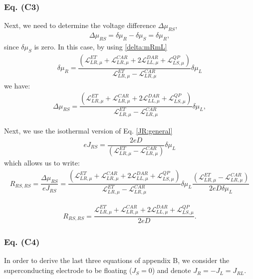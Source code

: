 \subsubsection{Eq. (C3)}

Next, we need to determine the voltage difference $\Delta\mu_{RS}$,
\begin{align*}
\Delta\mu_{RS}=\delta\mu_{R}-\delta\mu_{S}
=
\delta\mu_{R},
\end{align*}
since $\delta\mu_{S}$ is zero. In this case, by using \eqref{delta:mRmL}
\begin{align*}
\delta\mu_{R}=\dfrac{(\mathcal{L}_{LR,\mu}^{ET}+\mathcal{L}_{LR,\mu}^{CAR}+2\mathcal{L}_{LL,\mu}^{DAR}
+
\mathcal{L}^{QP}_{LS,\mu})}{\mathcal{L}_{LR,\mu}^{ET}-\mathcal{L}_{LR,\mu}^{CAR}}\delta\mu_{L}
\end{align*}
we have:
\begin{align*}
\Delta\mu_{RS}=\dfrac{(\mathcal{L}_{LR,\mu}^{ET}+\mathcal{L}_{LR,\mu}^{CAR}+2\mathcal{L}_{LL,\mu}^{DAR}
+
\mathcal{L}^{QP}_{LS,\mu})}{\mathcal{L}_{LR,\mu}^{ET}-\mathcal{L}_{LR,\mu}^{CAR}}\delta\mu_{L},
\end{align*}

Next, we use the isothermal version of Eq. \eqref{JR:general}
\begin{align*}
eJ_{RS}=
\dfrac{2eD}{(\mathcal{L}_{LR,\mu}^{ET}-\mathcal{L}_{LR,\mu}^{CAR})}\delta\mu_{L}
\end{align*}
which allows us to write:
\begin{align*}
    R_{RS,RS}=
\dfrac{\Delta\mu_{RS}}{eJ_{RS}}
=
\dfrac{(\mathcal{L}_{LR,\mu}^{ET}+\mathcal{L}_{LR,\mu}^{CAR}+2\mathcal{L}_{LL,\mu}^{DAR}
+
\mathcal{L}^{QP}_{LS,\mu})}{\mathcal{L}_{LR,\mu}^{ET}-\mathcal{L}_{LR,\mu}^{CAR}}\delta\mu_{L}\dfrac{(\mathcal{L}_{LR,\mu}^{ET}-\mathcal{L}_{LR,\mu}^{CAR})}{2eD\delta\mu_{L}}
\end{align*}


\begin{align}\label{RRSRS}
R_{RS,RS}=
\dfrac{\mathcal{L}_{LR,\mu}^{ET}+\mathcal{L}_{LR,\mu}^{CAR}+2\mathcal{L}_{LL,\mu}^{DAR}
+
\mathcal{L}^{QP}_{LS,\mu}}{2eD}.
\end{align}

\subsubsection{Eq. (C4)}

In order to derive the last three equations of appendix B, we consider the superconducting electrode to be floating ($J_{S}=0$) and denote $J_{R}=-J_{L}=J_{RL}$. 

